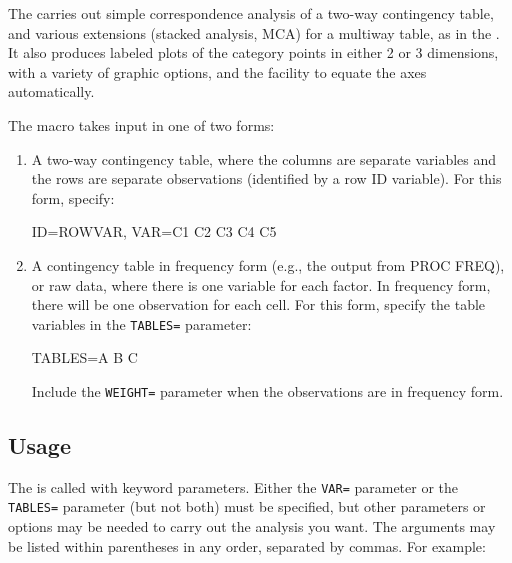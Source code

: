 


The  carries out simple correspondence analysis of a
two-way contingency table, and various extensions (stacked analysis,
MCA) for a multiway table, as in the .  It also
produces labeled plots of the category points in either 2 or 3
dimensions, with a variety of graphic options, and the facility to
equate the axes automatically. 

The macro takes input in one of two forms:

\begin{enumerate}

\item A two-way contingency table, where the columns are separate variables and the rows are separate observations (identified by a row ID variable). 
For this form, specify:
\begin{listing}
     ID=ROWVAR, VAR=C1 C2 C3 C4 C5
\end{listing}

\item A contingency table in frequency form (e.g., the output from PROC FREQ), or raw data, where there is one variable for each factor.  In frequency form, there will be one observation for each cell. For this form, specify the
table variables in the \texttt{TABLES=} parameter:
\begin{listing}
     TABLES=A B C
\end{listing}

Include the \texttt{WEIGHT=} parameter when the observations are in frequency
form.

\end{enumerate}

\subsection*{Usage}
The  is called with keyword parameters.  Either the
\texttt{VAR=} parameter or the \texttt{TABLES=} parameter (but not both) must be
specified, but other parameters or options may be needed to carry
out the analysis you want.  The arguments may be listed within
parentheses in any order, separated by commas.  For example:
\begin{listing}
\end{listing}

